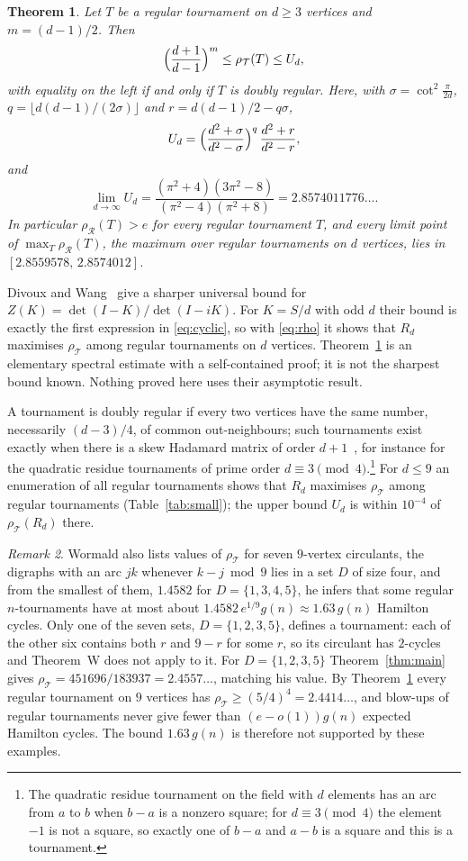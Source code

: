\documentclass[11pt,a4paper,reqno]{amsart}
\newtheorem{theorem}{Theorem}[section]
\theoremstyle{remark}
\newtheorem{remark}[theorem]{Remark}
\numberwithin{equation}{section}
\newcommand{\cT}{\mathcal{T}}
\newcommand{\cR}{\mathcal{R}}
\begin{document}
\begin{theorem}\label{thm:bounds}
Let $T$ be a regular tournament on $d\ge3$ vertices and $m=(d-1)/2$. Then
\[
\Bigl(\frac{d+1}{d-1}\Bigr)^{m}\le\rho_\cT(T)\le U_d,
\]
with equality on the left if and only if $T$ is doubly regular. Here, with $\sigma=\cot^2\frac{\pi}{2d}$, $q=\lfloor d(d-1)/(2\sigma)\rfloor$ and $r=d(d-1)/2-q\sigma$,
\[
U_d=\Bigl(\frac{d^2+\sigma}{d^2-\sigma}\Bigr)^{q}\,\frac{d^2+r}{d^2-r},
\]
and
\[
\lim_{d\to\infty}U_d=\frac{(\pi^2+4)(3\pi^2-8)}{(\pi^2-4)(\pi^2+8)}=2.8574011776\ldots.
\]
In particular $\rho_\cR(T)>e$ for every regular tournament $T$, and every limit point of $\max_T\rho_\cR(T)$, the maximum over regular tournaments on $d$ vertices, lies in $[2.8559578,\,2.8574012]$.
\end{theorem}

Divoux and Wang~\cite[Proposition~7.1]{DW} give a sharper universal bound for $Z(K)=\det(I-K)/\det(I-iK)$. For $K=S/d$ with odd $d$ their bound is exactly the first expression in \eqref{eq:cyclic}, so with \eqref{eq:rho} it shows that $R_d$ maximises $\rho_\cT$ among regular tournaments on $d$ vertices. Theorem~\ref{thm:bounds} is an elementary spectral estimate with a self-contained proof; it is not the sharpest bound known. Nothing proved here uses their asymptotic result.

A tournament is doubly regular if every two vertices have the same number, necessarily $(d-3)/4$, of common out-neighbours; such tournaments exist exactly when there is a skew Hadamard matrix of order $d+1$~\cite{RB}, for instance for the quadratic residue tournaments of prime order $d\equiv3\pmod 4$.\footnote{The quadratic residue tournament on the field with $d$ elements has an arc from $a$ to $b$ when $b-a$ is a nonzero square; for $d\equiv3\pmod4$ the element $-1$ is not a square, so exactly one of $b-a$ and $a-b$ is a square and this is a tournament.} For $d\le9$ an enumeration of all regular tournaments shows that $R_d$ maximises $\rho_\cT$ among regular tournaments (Table~\ref{tab:small}); the upper bound $U_d$ is within $10^{-4}$ of $\rho_\cT(R_d)$ there.

\begin{remark}\label{rem:circulants}
Wormald also lists values of $\rho_\cT$ for seven $9$-vertex circulants, the digraphs with an arc $jk$ whenever $k-j\bmod 9$ lies in a set $D$ of size four, and from the smallest of them, $1.4582$ for $D=\{1,3,4,5\}$, he infers that some regular $n$-tournaments have at most about $1.4582\,e^{1/9}g(n)\approx1.63\,g(n)$ Hamilton cycles. Only one of the seven sets, $D=\{1,2,3,5\}$, defines a tournament: each of the other six contains both $r$ and $9-r$ for some $r$, so its circulant has $2$-cycles and Theorem~W does not apply to it. For $D=\{1,2,3,5\}$ Theorem~\ref{thm:main} gives $\rho_\cT=451696/183937=2.4557\ldots$, matching his value. By Theorem~\ref{thm:bounds} every regular tournament on $9$ vertices has $\rho_\cT\ge(5/4)^4=2.4414\ldots$, and blow-ups of regular tournaments never give fewer than $(e-o(1))g(n)$ expected Hamilton cycles. The bound $1.63\,g(n)$ is therefore not supported by these examples.
\end{remark}
\end{document}
